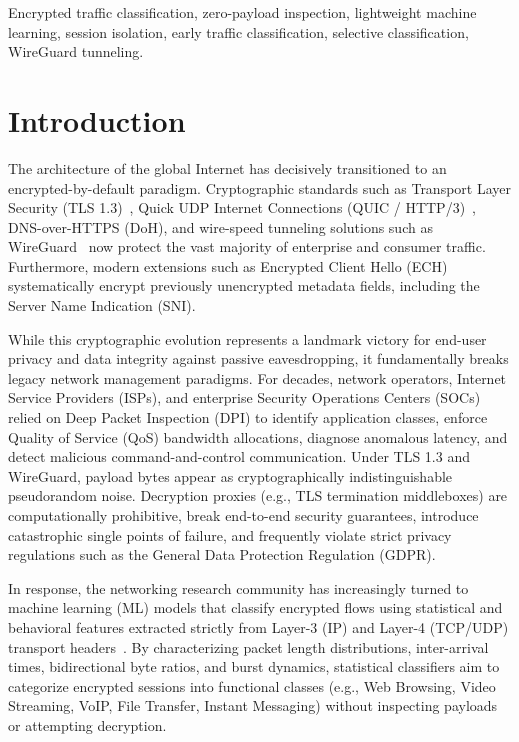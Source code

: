 \documentclass[conference]{IEEEtran}
\begin{document}
\begin{IEEEkeywords}
Encrypted traffic classification, zero-payload inspection, lightweight machine learning, session isolation, early traffic classification, selective classification, WireGuard tunneling.
\end{IEEEkeywords}

\section{Introduction}
\label{sec:intro}

The architecture of the global Internet has decisively transitioned to an encrypted-by-default paradigm. Cryptographic standards such as Transport Layer Security (TLS 1.3)~\cite{rescorla2018tls}, Quick UDP Internet Connections (QUIC / HTTP/3)~\cite{iyengar2021quic}, DNS-over-HTTPS (DoH), and wire-speed tunneling solutions such as WireGuard~\cite{donenfeld2017wireguard} now protect the vast majority of enterprise and consumer traffic. Furthermore, modern extensions such as Encrypted Client Hello (ECH) systematically encrypt previously unencrypted metadata fields, including the Server Name Indication (SNI).

While this cryptographic evolution represents a landmark victory for end-user privacy and data integrity against passive eavesdropping, it fundamentally breaks legacy network management paradigms. For decades, network operators, Internet Service Providers (ISPs), and enterprise Security Operations Centers (SOCs) relied on Deep Packet Inspection (DPI) to identify application classes, enforce Quality of Service (QoS) bandwidth allocations, diagnose anomalous latency, and detect malicious command-and-control communication. Under TLS 1.3 and WireGuard, payload bytes appear as cryptographically indistinguishable pseudorandom noise. Decryption proxies (e.g., TLS termination middleboxes) are computationally prohibitive, break end-to-end security guarantees, introduce catastrophic single points of failure, and frequently violate strict privacy regulations such as the General Data Protection Regulation (GDPR).

In response, the networking research community has increasingly turned to machine learning (ML) models that classify encrypted flows using statistical and behavioral features extracted strictly from Layer-3 (IP) and Layer-4 (TCP/UDP) transport headers~\cite{paxson1994empirically,moore2005internet,crotti2007traffic,taylor2016appscanner}. By characterizing packet length distributions, inter-arrival times, bidirectional byte ratios, and burst dynamics, statistical classifiers aim to categorize encrypted sessions into functional classes (e.g., Web Browsing, Video Streaming, VoIP, File Transfer, Instant Messaging) without inspecting payloads or attempting decryption.
\end{document}
